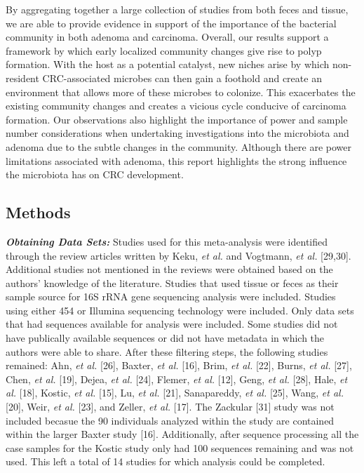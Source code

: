 \documentclass[12pt,]{article}
\begin{document}
By aggregating together a large collection of studies from both feces
and tissue, we are able to provide evidence in support of the importance
of the bacterial community in both adenoma and carcinoma. Overall, our
results support a framework by which early localized community changes
give rise to polyp formation. With the host as a potential catalyst, new
niches arise by which non-resident CRC-associated microbes can then gain
a foothold and create an environment that allows more of these microbes
to colonize. This exacerbates the existing community changes and creates
a vicious cycle conducive of carcinoma formation. Our observations also
highlight the importance of power and sample number considerations when
undertaking investigations into the microbiota and adenoma due to the
subtle changes in the community. Although there are power limitations
associated with adenoma, this report highlights the strong influence the
microbiota has on CRC development.

\newpage

\subsection{Methods}\label{methods}

\textbf{\emph{Obtaining Data Sets:}} Studies used for this meta-analysis
were identified through the review articles written by Keku, \emph{et
al.} and Vogtmann, \emph{et al.} {[}29,30{]}. Additional studies not
mentioned in the reviews were obtained based on the authors' knowledge
of the literature. Studies that used tissue or feces as their sample
source for 16S rRNA gene sequencing analysis were included. Studies
using either 454 or Illumina sequencing technology were included. Only
data sets that had sequences available for analysis were included. Some
studies did not have publically available sequences or did not have
metadata in which the authors were able to share. After these filtering
steps, the following studies remained: Ahn, \emph{et al.} {[}26{]},
Baxter, \emph{et al.} {[}16{]}, Brim, \emph{et al.} {[}22{]}, Burns,
\emph{et al.} {[}27{]}, Chen, \emph{et al.} {[}19{]}, Dejea, \emph{et
al.} {[}24{]}, Flemer, \emph{et al.} {[}12{]}, Geng, \emph{et al.}
{[}28{]}, Hale, \emph{et al.} {[}18{]}, Kostic, \emph{et al.} {[}15{]},
Lu, \emph{et al.} {[}21{]}, Sanapareddy, \emph{et al.} {[}25{]}, Wang,
\emph{et al.} {[}20{]}, Weir, \emph{et al.} {[}23{]}, and Zeller,
\emph{et al.} {[}17{]}. The Zackular {[}31{]} study was not included
becasue the 90 individuals analyzed within the study are contained
within the larger Baxter study {[}16{]}. Additionally, after sequence
processing all the case samples for the Kostic study only had 100
sequences remaining and was not used. This left a total of 14 studies
for which analysis could be completed.
\end{document}
